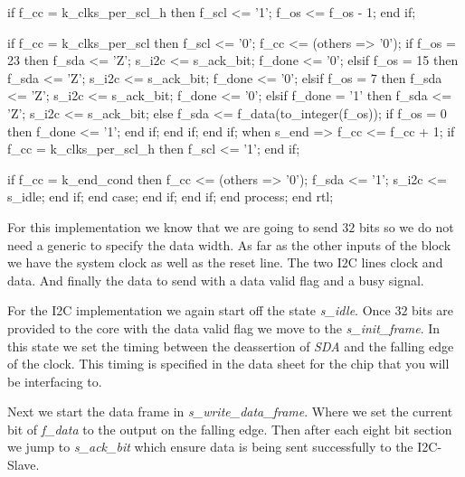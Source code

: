 \begin{VHDLlisting}[tabsize=4]
                        if f_cc = k_clks_per_scl_h then
                            f_scl <= '1';
                            f_os <= f_os - 1;
                        end if; 
						
                        if f_cc = k_clks_per_scl then
							f_scl <= '0';
                            f_cc <= (others => '0');
							if f_os = 23 then
								f_sda <= 'Z';
								s_i2c <= s_ack_bit;
								f_done <= '0';
                            elsif f_os = 15 then
								f_sda <= 'Z';
								s_i2c <= s_ack_bit;
								f_done <= '0';
                            elsif f_os = 7 then
								f_sda <= 'Z';
								s_i2c <= s_ack_bit;
								f_done <= '0';
                            elsif f_done = '1' then
								f_sda <= 'Z';
                                s_i2c <= s_ack_bit;
							else
								f_sda <= f_data(to_integer(f_os));
								if f_os = 0 then
									f_done <= '1';
								end if;
                            end if;
                        end if;
					when s_end =>
						f_cc <= f_cc + 1;
						if f_cc = k_clks_per_scl_h then
                            f_scl <= '1';
                        end if; 
						
                        if f_cc = k_end_cond then
                            f_cc <= (others => '0');
							f_sda <= '1';
							s_i2c <= s_idle;
                        end if;
                end case;
            end if;
        end if;
    end process;
end rtl;
\end{VHDLlisting}

For this implementation we know that we are going to send $32$ bits so we do not need a generic to specify the data width. As far as the other inputs of the block we have the system clock as well as the reset line. The two \ac{I2C} lines clock and data. And finally the data to send with a data valid flag and a busy signal. 

For the \ac{I2C} implementation we again start off the state \emph{s\_idle}. Once $32$ bits are provided to the core with the data valid flag we move to the \emph{s\_init\_frame}. In this state we set the timing between the deassertion of \emph{SDA} and the falling edge of the clock. This timing is specified in the data sheet for the chip that you will be interfacing to. 

Next we start the data frame in \emph{s\_write\_data\_frame}. Where we set the current bit of \emph{f\_data} to the output on the falling edge. Then after each eight bit section we jump to \emph{s\_ack\_bit} which ensure data is being sent successfully to the \ac{I2C}-Slave.

